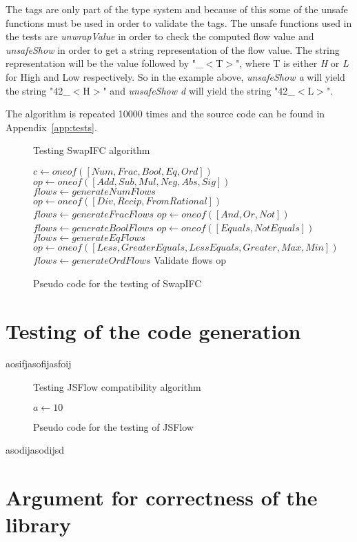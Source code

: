The tags are only part of the type system and because of this some of the unsafe functions must be used in order to validate the tags. The unsafe functions used in the tests are \emph{unwrapValue} in order to check the computed flow value and \emph{unsafeShow} in order to get a string representation of the flow value. The string representation will be the value followed by "\_$<$T$>$", where T is either \emph{H} or \emph{L} for High and Low respectively. So in the example above, \emph{unsafeShow a} will yield the string "42\_$<$H$>$" and \emph{unsafeShow d} will yield the string "42\_$<$L$>$".

The algorithm is repeated 10000 times and the source code can be found in Appendix~\ref{app:tests}.

\begin{figure}[h]
  \begin{algorithm}[H]
    \caption{Testing SwapIFC algorithm}
    \begin{algorithmic}
      \State $c\gets oneof([Num, Frac, Bool, Eq, Ord])$
      \State $op\gets oneof([Add, Sub, Mul, Neg, Abs, Sig])$
      \State $flows\gets generateNumFlows$
      \EndIf        
      \State $op\gets oneof([Div, Recip, FromRational])$
      \State $flows\gets generateFracFlows$
      \EndIf
      \State $op\gets oneof([And, Or, Not])$
      \State $flows\gets generateBoolFlows$
      \EndIf
      \State $op\gets oneof([Equals, NotEquals])$
      \State $flows\gets generateEqFlows$
      \EndIf
      \State $op\gets oneof([Less, GreaterEquals, LessEquals, Greater, Max, Min])$
      \State $flows\gets generateOrdFlows$
      \EndIf
      \State
      \State
      \Return Validate flows op
    \end{algorithmic}
  \end{algorithm}
  \caption{Pseudo code for the testing of SwapIFC}
  \label{fig:testing_swapifc}
\end{figure}

\section{Testing of the code generation}
aosifjasofijasfoij
\begin{figure}[h]
  \begin{algorithm}[H]
    \caption{Testing JSFlow compatibility algorithm}
    \begin{algorithmic}
      \State $a\gets 10$
      \EndIf
    \end{algorithmic}
  \end{algorithm}
  \caption{Pseudo code for the testing of JSFlow}
  \label{fig:testing_jsflow}
\end{figure}
asodijasodijsd

\section{Argument for correctness of the library}
